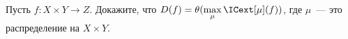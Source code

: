 Пусть $f: X \times Y \to Z$. Докажите, что $D(f) = \theta(\max\limits_{\mu} \ICext[\mu](f))$, где
$\mu$~--- это распределение на $X \times Y$.
